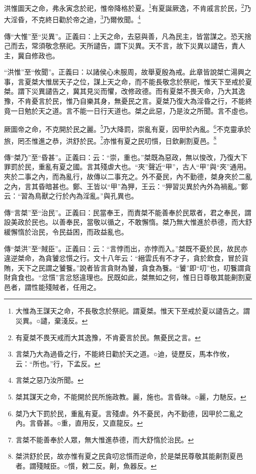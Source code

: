洪惟圖天之命，弗永寅念於祀，惟帝降格於夏。\footnote{大惟為王謀天之命，不長敬念於祭祀。謂夏桀。惟天下至戒於夏以譴告之。謂災異。○譴，棄淺反。}有夏誕厥逸，不肯戚言於民，\footnote{有夏桀不畏天戒而大其逸豫，不肯憂言於民。無憂民之言。}乃大淫昏，不克終日勸於帝之迪，\footnote{言桀乃大為過昏之行，不能終日勸於天之道。○迪，徒歷反，馬本作攸，云：“所也。”行，下孟反。}乃爾攸聞。\footnote{言桀之惡乃汝所聞。}


{\noindent\zhuan{}\fzbyks 傳“大惟”至“災異”。正義曰：上天之命，去惡與善，凡為民主，皆當謀之。恐天捨己而去，常須敬念祭祀。天所譴告，謂下災異。天不言，故下災異以譴告，責人主，冀自修政也。 \par}

{\noindent\shu{}\fzkt “洪惟”至“攸聞”。正義曰：以諸侯心未服周，故舉夏殷為戒。此章皆說桀亡湯興之事，言夏桀大惟居天子之位，謀上天之命，而不能長敬念於祭祀，惟天下至戒於夏桀。謂下災異譴告之，冀其見災而懼，改修政德。而有夏桀不畏天命，乃大其逸豫，不肯憂言於民，惟乃自樂其身，無憂民之言。夏桀乃復大為淫昏之行，不能終竟一日勉於天之道。言不能一日行天道也。桀之此惡，乃是汝之所聞。言不虛也。 \par}

厥圖帝之命，不克開於民之麗。\footnote{桀其謀天之命，不能開於民所施政教。麗，施也。言昏昧。○麗，力馳反。}乃大降罰，崇亂有夏，因甲於內亂。\footnote{桀乃大下罰於民，重亂有夏。言殘虐。外不憂民，內不勤德，因甲於二亂之內。言昏甚。○重，直用反，又直龍反。}不克靈承於旅，罔丕惟進之恭，洪舒於民。\footnote{言桀不能善奉於人眾，無大惟進恭德，而大舒惰於治民。}亦惟有夏之民叨懫，日欽劓割夏邑。\footnote{桀洪舒於民，故亦惟有夏之民貪叨忿懫而逆命，於是桀民尊敬其能劓割夏邑者。謂殘賊臣。○懫，敕二反。劓，魚器反。}


{\noindent\zhuan{}\fzbyks 傳“桀乃”至“昏甚”。正義曰：云：“崇，重也。”桀既為惡政，無以悛改，乃復大下罪罰於民，重亂有夏之國。言其殘虐大也。“夾”聲近“甲”，古人“甲”與“夾”通用。夾於二事之內，而為亂行，故傳以二事充之。外不憂民，內不勤德，桀身夾於二亂之內，言其昏暗甚也。鄭、王皆以“甲”為狎，王云：“狎習災異於內外為禍亂。”鄭云：“習為鳥獸之行於內為淫亂。”與孔異也。 \par}

{\noindent\zhuan{}\fzbyks 傳“言桀”至“治民”。正義曰：民當奉王，而責桀不能善奉於民眾者，君之奉民，謂設美政於民也。以善奉民，當敬以循之，不敢懈惰。桀乃無大惟進於恭德，而大舒緩懈惰於治民，令民益困，而政益亂也。 \par}

{\noindent\zhuan{}\fzbyks 傳“桀洪”至“賊臣”。正義曰：云：“言悖而出，亦悖而入。”桀既不憂於民，故民亦違逆桀命，為貪饕忿懫之行。文十八年云：“縉雲氏有不才子，貪於飲食，冒於貨賄，天下之民謂之饕餮。”說者皆言貪財為饕，貪食為餮。“饕”即“叨”也，叨餮謂貪財貪食也。“忿懫”言忿怒違理也。民既如此，桀無如之何，惟日日尊敬其能劓割夏邑者，謂性能殘賊者，任用之。 \par}

